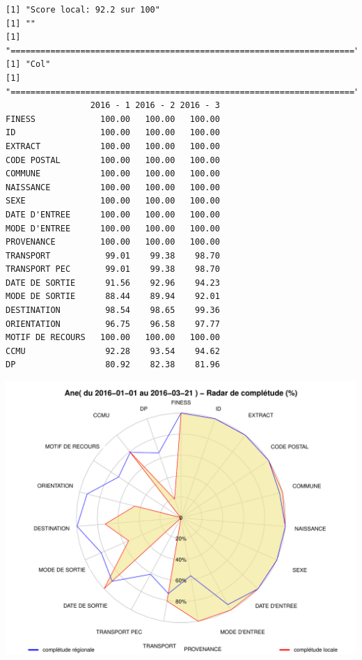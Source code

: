 \documentclass[]{article}
\begin{document}
\begin{verbatim}
[1] "Score local: 92.2 sur 100"
[1] ""
[1] "====================================================================="
[1] "Col"
[1] "====================================================================="
                 2016 - 1 2016 - 2 2016 - 3
FINESS             100.00   100.00   100.00
ID                 100.00   100.00   100.00
EXTRACT            100.00   100.00   100.00
CODE POSTAL        100.00   100.00   100.00
COMMUNE            100.00   100.00   100.00
NAISSANCE          100.00   100.00   100.00
SEXE               100.00   100.00   100.00
DATE D'ENTREE      100.00   100.00   100.00
MODE D'ENTREE      100.00   100.00   100.00
PROVENANCE         100.00   100.00   100.00
TRANSPORT           99.01    99.38    98.70
TRANSPORT PEC       99.01    99.38    98.70
DATE DE SORTIE      91.56    92.96    94.23
MODE DE SORTIE      88.44    89.94    92.01
DESTINATION         98.54    98.65    99.36
ORIENTATION         96.75    96.58    97.77
MOTIF DE RECOURS   100.00   100.00   100.00
CCMU                92.28    93.54    94.62
DP                  80.92    82.38    81.96
\end{verbatim}

\includegraphics{completude_files/figure-latex/finess-16.pdf}
\end{document}
